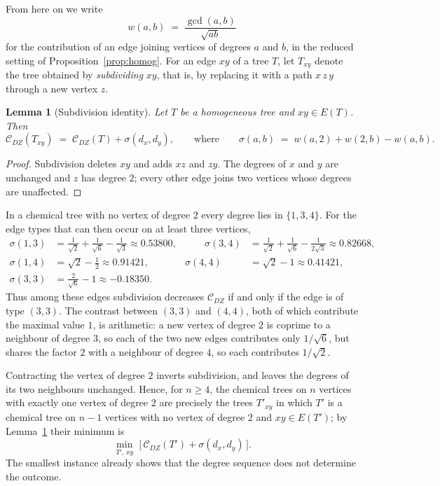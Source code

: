 \documentclass[11pt,a4paper]{article}
\theoremstyle{plain}
\newtheorem{lemma}[theorem]{Lemma}
\theoremstyle{definition}
\theoremstyle{remark}
\newcommand{\CDZ}{\mathcal{C}_{DZ}}
\newcommand{\gcdd}{\operatorname{gcd}}
\begin{document}
From here on we write
\[
  w(a,b)\;=\;\frac{\gcdd(a,b)}{\sqrt{ab}}
\]
for the contribution of an edge joining vertices of degrees $a$ and $b$, in the
reduced setting of Proposition~\ref{prop:homog}. For an edge $xy$ of a tree $T$,
let $T_{xy}$ denote the tree obtained by \emph{subdividing} $xy$, that is, by
replacing it with a path $x\,z\,y$ through a new vertex $z$.

\begin{lemma}[Subdivision identity]
\label{lem:subdiv}
Let $T$ be a homogeneous tree and $xy\in E(T)$. Then
\[
  \CDZ(T_{xy})\;=\;\CDZ(T)+\sigma(d_x,d_y),
  \qquad\text{where}\qquad
  \sigma(a,b)\;=\;w(a,2)+w(2,b)-w(a,b).
\]
\end{lemma}

\begin{proof}
Subdivision deletes $xy$ and adds $xz$ and $zy$. The degrees of $x$ and $y$ are
unchanged and $z$ has degree $2$; every other edge joins two vertices whose
degrees are unaffected.
\end{proof}

In a chemical tree with no vertex of degree $2$ every degree lies in
$\{1,3,4\}$. For the edge types that can then occur on at least three vertices,
\begin{equation}
\label{eq:sigma}
\begin{aligned}
  \sigma(1,3)&=\tfrac{1}{\sqrt2}+\tfrac{1}{\sqrt6}-\tfrac{1}{\sqrt3}\approx0.53800, &\qquad
  \sigma(3,4)&=\tfrac{1}{\sqrt2}+\tfrac{1}{\sqrt6}-\tfrac{1}{2\sqrt3}\approx0.82668,\\
  \sigma(1,4)&=\sqrt2-\tfrac12\approx0.91421, &
  \sigma(4,4)&=\sqrt2-1\approx0.41421,\\
  \sigma(3,3)&=\tfrac{2}{\sqrt6}-1\approx-0.18350 .
\end{aligned}
\end{equation}
Thus among these edges subdivision decreases $\CDZ$ if and only if the edge is
of type $(3,3)$. The contrast between $(3,3)$ and $(4,4)$, both of which
contribute the maximal value $1$, is arithmetic: a new vertex of degree $2$ is
coprime to a neighbour of degree $3$, so each of the two new edges contributes
only $1/\sqrt6$, but shares the factor $2$ with a neighbour of degree $4$, so
each contributes $1/\sqrt2$.

Contracting the vertex of degree $2$ inverts subdivision, and leaves the degrees
of its two neighbours unchanged. Hence, for $n\ge4$, the chemical trees on $n$
vertices with exactly one vertex of degree $2$ are precisely the trees $T'_{xy}$
in which $T'$ is a chemical tree on $n-1$ vertices with no vertex of degree $2$
and $xy\in E(T')$; by Lemma~\ref{lem:subdiv} their minimum is
\begin{equation}
\label{eq:onetwo}
  \min_{T',\,xy}\;\bigl[\,\CDZ(T')+\sigma(d_x,d_y)\,\bigr].
\end{equation}
The smallest instance already shows that the degree sequence does not determine
the outcome.
\end{document}

